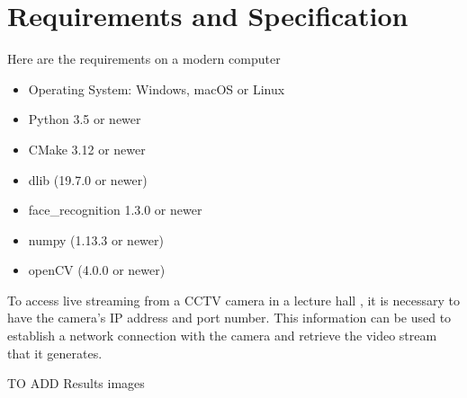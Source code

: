 \section{Requirements and Specification}
Here are the requirements on a modern computer
    \begin{itemize}
    \item Operating System: Windows, macOS or Linux
    \item Python 3.5 or newer
    \item CMake 3.12 or newer
    \item dlib (19.7.0 or newer)
    \item face\_recognition 1.3.0 or newer
    \item numpy (1.13.3 or newer)
    \item openCV (4.0.0 or newer)
    \end{itemize}
    To access live streaming from a CCTV camera in a lecture hall , it is necessary to have the camera's IP address and port number. This information can be used to establish a network connection with the camera and retrieve the video stream that it generates.


    TO ADD Results images